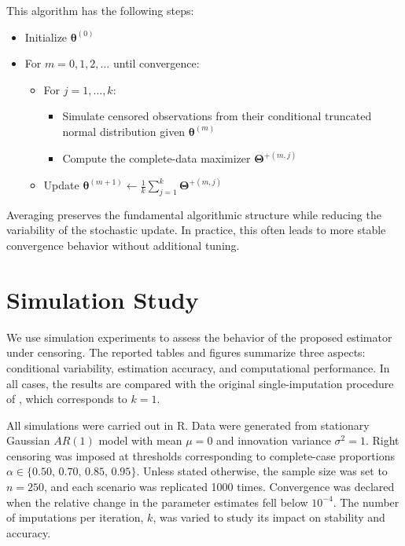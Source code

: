 \documentclass[twoside]{article}
\begin{document}
\begin{alg}\label{alg:PAEM}
This algorithm has the following steps:
\begin{itemize}
\item Initialize $\boldsymbol{\theta}^{(0)}$
\item For $m=0,1,2,\ldots$ until convergence:
\begin{itemize}
\item For $j=1,\ldots,k$:
\begin{itemize}
\item Simulate censored observations from their conditional truncated normal distribution given $\boldsymbol{\theta}^{(m)}$
\item Compute the complete-data maximizer $\boldsymbol{\Theta}^{+(m,j)}$
\end{itemize}
\item Update $\boldsymbol{\theta}^{(m+1)} \leftarrow \frac{1}{k}\sum_{j=1}^k \boldsymbol{\Theta}^{+(m,j)}$
\end{itemize}
\end{itemize}
\end{alg}

Averaging preserves the fundamental algorithmic structure while reducing the variability of the stochastic update. In practice, this often leads to more stable convergence behavior without additional tuning.

	\section{Simulation Study}
	\label{sec:simulations}
	
	We use simulation experiments to assess the behavior of the proposed estimator under censoring. The reported tables and figures summarize three aspects: conditional variability, estimation accuracy, and computational performance. In all cases, the results are compared with the original single-imputation procedure of \citet{park2007}, which corresponds to $k=1$.
	
All simulations were carried out in \textsf{R}. Data were generated from stationary Gaussian $AR(1)$ model with mean $\mu=0$ and innovation variance $\sigma^2=1$. Right censoring was imposed at thresholds corresponding to complete-case proportions $\alpha \in \{0.50,\,0.70,\,0.85,\,0.95\}$. Unless stated otherwise, the sample size was set to $n=250$, and each scenario was replicated 1000 times. Convergence was declared when the relative change in the parameter estimates fell below $10^{-4}$. The number of imputations per iteration, $k$, was varied to study its impact on stability and accuracy.
	
\end{document}
